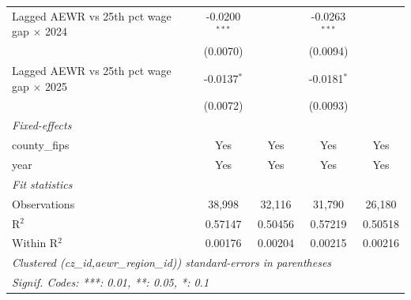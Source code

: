 \begin{tabular}{lcccc}
   Lagged AEWR vs 25th pct wage gap $\times$ 2024  & -0.0200$^{***}$ &                 & -0.0263$^{***}$        &   \\   
                                                   & (0.0070)        &                 & (0.0094)               &   \\   
   Lagged AEWR vs 25th pct wage gap $\times$ 2025  & -0.0137$^{*}$   &                 & -0.0181$^{*}$          &   \\   
                                                   & (0.0072)        &                 & (0.0093)               &   \\   
   \midrule
   \emph{Fixed-effects}\\
   county\_fips                                    & Yes             & Yes             & Yes                    & Yes\\  
   year                                            & Yes             & Yes             & Yes                    & Yes\\  
   \midrule
   \emph{Fit statistics}\\
   Observations                                    & 38,998          & 32,116          & 31,790                 & 26,180\\  
   R$^2$                                           & 0.57147         & 0.50456         & 0.57219                & 0.50518\\  
   Within R$^2$                                    & 0.00176         & 0.00204         & 0.00215                & 0.00216\\  
   \midrule \midrule
   \multicolumn{5}{l}{\emph{Clustered (cz\_id,aewr\_region\_id)) standard-errors in parentheses}}\\
   \multicolumn{5}{l}{\emph{Signif. Codes: ***: 0.01, **: 0.05, *: 0.1}}\\
\end{tabular}
\par\endgroup


